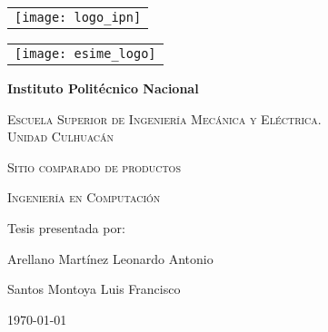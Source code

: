 \begin{titlepage}
    {
        \noindent
        \begin{tabular}{@{}c@{}}{\texttt{[image: logo\_ipn]}}\end{tabular}
        \hfill
        \begin{tabular}{@{}c@{}}{\texttt{[image: esime\_logo]}}\end{tabular}
    }
    \begin{center}
        {\bfseries\LARGE Instituto Politécnico Nacional \par}
        \vspace{0.5cm}
        
        {\scshape\Large Escuela Superior de Ingeniería Mecánica y Eléctrica. \\ 
        Unidad Culhuacán \par}
        \vspace{1.5cm}
        
%        
        
        {\scshape\Huge Sitio comparado de productos \par}
        \vspace{1cm}

        {{\scshape\Large Ingeniería en Computación \par}}
        \vspace{0.5cm}

	   {\Large Tesis presentada por: \par}
        {\Large Arellano Martínez Leonardo Antonio \par}
        {\Large Santos Montoya Luis Francisco \par}
        
        \vfill
        {\Large \today \par}
    \end{center}
\end{titlepage}